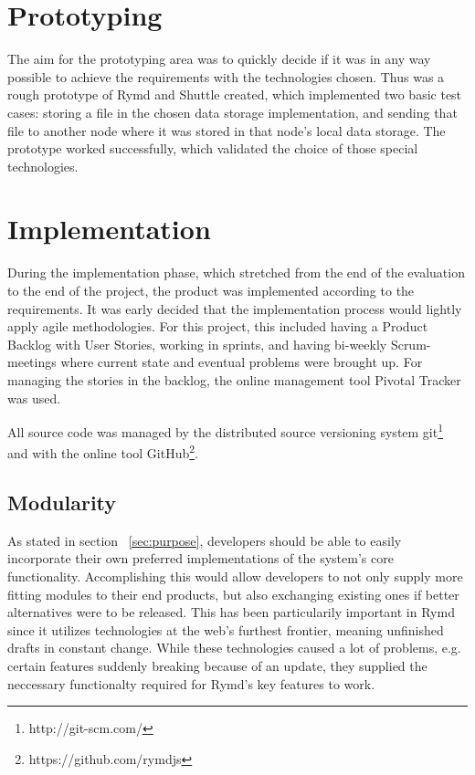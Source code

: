 \section{Prototyping}

The aim for the prototyping area was to quickly decide if it was in any way possible to achieve the requirements with the technologies chosen. Thus was a rough prototype of Rymd and Shuttle created, which implemented two basic test cases: storing a file in the chosen data storage implementation, and sending that file to another node where it was stored in that node's local data storage. The prototype worked successfully, which validated the choice of those special technologies.

\section{Implementation}

During the implementation phase, which stretched from the end of the evaluation to the end of the project, the product was implemented according to the requirements. It was early decided that the implementation process would lightly apply agile methodologies. For this project, this included having a Product Backlog with User Stories, working in sprints, and having bi-weekly Scrum-meetings where current state and eventual problems were brought up. For managing the stories in the backlog, the online management tool Pivotal Tracker was used.

All source code was managed by the distributed source versioning system git\footnote{http://git-scm.com/} and with the online tool GitHub\footnote{https://github.com/rymdjs}.

\subsection{Modularity}

As stated in section ~\ref{sec:purpose}, developers should be able to easily incorporate their own preferred implementations of the system's core functionality. Accomplishing this would allow developers to not only supply more fitting modules to their end products, but also exchanging existing ones if better alternatives were to be released. This has been particularily important in Rymd since it utilizes technologies at the web's furthest frontier, meaning unfinished drafts in constant change. While these technologies caused a lot of problems, e.g. certain features suddenly breaking because of an update, they supplied the neccessary functionalty required for Rymd's key features to work.

